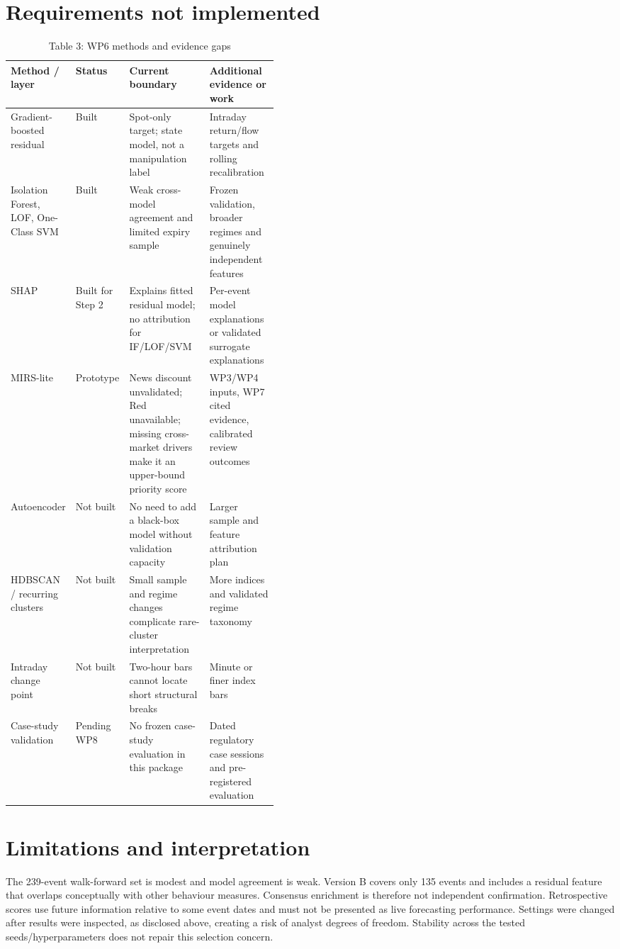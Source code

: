 \documentclass[11pt,a4paper]{article}
\begin{document}
\section{Requirements not implemented}
\begin{table}[htbp]\centering\caption{Table 3: WP6 methods and evidence gaps}\small
\begin{tabularx}{\linewidth}{p{0.24\linewidth}p{0.20\linewidth}X X}\toprule Method / layer & Status & Current boundary & Additional evidence or work\\\midrule
Gradient-boosted residual & Built & Spot-only target; state model, not a manipulation label & Intraday return/flow targets and rolling recalibration\\
Isolation Forest, LOF, One-Class SVM & Built & Weak cross-model agreement and limited expiry sample & Frozen validation, broader regimes and genuinely independent features\\
SHAP & Built for Step 2 & Explains fitted residual model; no attribution for IF/LOF/SVM & Per-event model explanations or validated surrogate explanations\\
MIRS-lite & Prototype & News discount unvalidated; Red unavailable; missing cross-market drivers make it an upper-bound priority score & WP3/WP4 inputs, WP7 cited evidence, calibrated review outcomes\\
Autoencoder & Not built & No need to add a black-box model without validation capacity & Larger sample and feature attribution plan\\
HDBSCAN / recurring clusters & Not built & Small sample and regime changes complicate rare-cluster interpretation & More indices and validated regime taxonomy\\
Intraday change point & Not built & Two-hour bars cannot locate short structural breaks & Minute or finer index bars\\
Case-study validation & Pending WP8 & No frozen case-study evaluation in this package & Dated regulatory case sessions and pre-registered evaluation\\\bottomrule\end{tabularx}\end{table}

\section{Limitations and interpretation}
The 239-event walk-forward set is modest and model agreement is weak. Version B covers only 135 events and includes a residual feature that overlaps conceptually with other behaviour measures. Consensus enrichment is therefore not independent confirmation. Retrospective scores use future information relative to some event dates and must not be presented as live forecasting performance. Settings were changed after results were inspected, as disclosed above, creating a risk of analyst degrees of freedom. Stability across the tested seeds/hyperparameters does not repair this selection concern.
\end{document}
